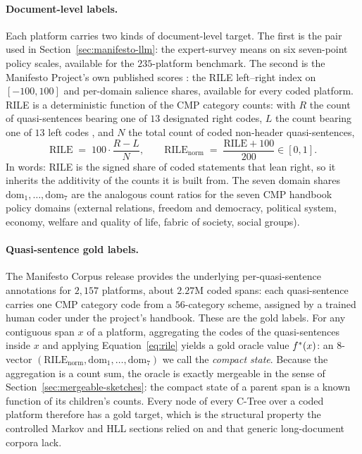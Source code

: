 \paragraph{Document-level labels.} Each platform carries two kinds of
document-level target. The first is the pair used in
Section~\ref{sec:manifesto-llm}: the \citet{BenoitEtAl2025}
expert-survey means on six seven-point policy scales, available for the
$235$-platform benchmark. The second is the Manifesto Project's own
published scores \citep{ManifestoProject2025a}: the RILE left--right
index on $[-100, 100]$ and per-domain salience shares, available for
every coded platform. RILE is a deterministic function of the CMP
category counts: with $R$ the count of quasi-sentences bearing one of
$13$ designated right codes, $L$ the count bearing one of $13$ left
codes \citep{LaverBudge1992}, and $N$ the total count of coded
non-header quasi-sentences,
\begin{equation}\label{eq:rile}
\mathrm{RILE} \;=\; 100\cdot\frac{R - L}{N},
\qquad
\mathrm{RILE}_{\mathrm{norm}} \;=\; \frac{\mathrm{RILE} + 100}{200}\in[0,1].
\end{equation}
In words: RILE is the signed share of coded statements that lean right,
so it inherits the additivity of the counts it is built from. The seven
domain shares $\mathrm{dom}_1,\dots,\mathrm{dom}_7$ are the analogous
count ratios for the seven CMP handbook policy domains (external
relations, freedom and democracy, political system, economy, welfare
and quality of life, fabric of society, social groups).

\paragraph{Quasi-sentence gold labels.} The Manifesto Corpus release
provides the underlying per-quasi-sentence annotations for $2{,}157$
platforms, about $2.27$M coded spans: each quasi-sentence carries one
CMP category code from a $56$-category scheme, assigned by a trained
human coder under the project's handbook. These are the gold labels.
For any contiguous span $x$ of a platform, aggregating the codes of the
quasi-sentences inside $x$ and applying Equation~\eqref{eq:rile} yields
a gold oracle value $f^\ast(x)$: an $8$-vector
$(\mathrm{RILE}_{\mathrm{norm}}, \mathrm{dom}_1, \dots, \mathrm{dom}_7)$
we call the \emph{compact state}. Because the aggregation is a count
sum, the oracle is exactly mergeable in the sense of
Section~\ref{sec:mergeable-sketches}: the compact state of a parent
span is a known function of its children's counts. Every node of every
C-Tree over a coded platform therefore has a gold target, which is the
structural property the controlled Markov and HLL sections relied on
and that generic long-document corpora lack.

